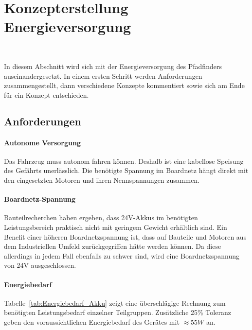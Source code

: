 \documentclass[main.tex]{subfiles} %
\begin{document}

\section{Konzepterstellung Energieversorgung}~\label{appendix:Boardnetz}

In diesem Abschnitt wird sich mit der Energieversorgung des Pfadfinders
auseinandergesetzt. In einem ersten Schritt werden Anforderungen
zusammengestellt, dann verschiedene Konzepte kommentiert sowie sich am Ende für
ein Konzept entschieden.

\subsection*{Anforderungen}

\paragraph{Autonome Versorgung}
Das Fahrzeug muss autonom fahren können. Deshalb ist eine kabellose Speisung
des Gefährts unerlässlich. Die benötigte Spannung im Boardnetz hängt direkt mit
den eingesetzten Motoren und ihren Nennspannungen zusammen.

\paragraph{Boardnetz-Spannung}
Bauteilrecherchen haben ergeben, dass 24V-Akkus im benötigten Leistungsbereich
praktisch nicht mit geringem Gewicht erhältlich sind. Ein Benefit einer höheren
Boardnetzspannung ist, dass auf Bauteile und Motoren aus dem Industriellen
Umfeld zurückgegriffen hätte werden können. Da diese allerdings in jedem Fall
ebenfalls zu schwer sind, wird eine Boardnetzspannung von 24V ausgeschlossen.

\paragraph{Energiebedarf}
Tabelle~\ref{tab:Energiebedarf_Akku} zeigt eine überschlägige Rechnung zum
benötigten Leistungsbedarf einzelner Teilgruppen. Zusätzliche 25\% Toleranz
geben den voraussichtlichen Energiebedarf des Gerätes mit $\approx 55W$ an.
\end{document}
